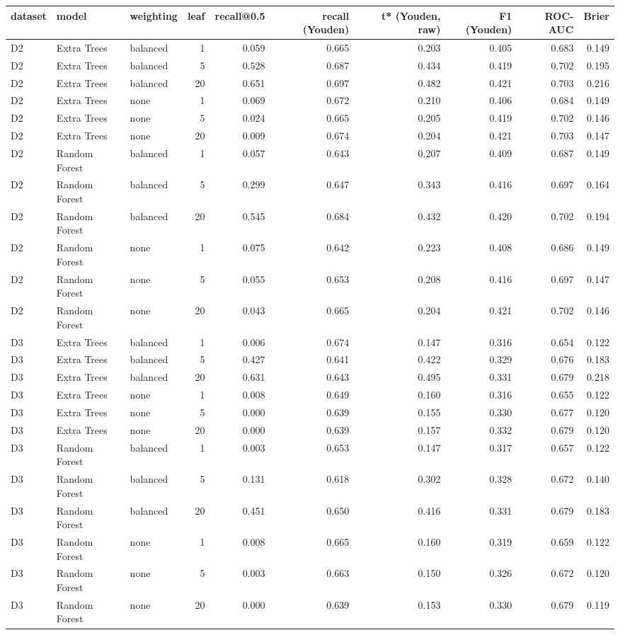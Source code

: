 \begin{tabular}{lllrrrrrrr}
\toprule
dataset & model & weighting & leaf & recall@0.5 & recall (Youden) & t* (Youden, raw) & F1 (Youden) & ROC-AUC & Brier \\
\midrule
D2 & Extra Trees & balanced & 1 & 0.059 & 0.665 & 0.203 & 0.405 & 0.683 & 0.149 \\
D2 & Extra Trees & balanced & 5 & 0.528 & 0.687 & 0.434 & 0.419 & 0.702 & 0.195 \\
D2 & Extra Trees & balanced & 20 & 0.651 & 0.697 & 0.482 & 0.421 & 0.703 & 0.216 \\
D2 & Extra Trees & none & 1 & 0.069 & 0.672 & 0.210 & 0.406 & 0.684 & 0.149 \\
D2 & Extra Trees & none & 5 & 0.024 & 0.665 & 0.205 & 0.419 & 0.702 & 0.146 \\
D2 & Extra Trees & none & 20 & 0.009 & 0.674 & 0.204 & 0.421 & 0.703 & 0.147 \\
D2 & Random Forest & balanced & 1 & 0.057 & 0.643 & 0.207 & 0.409 & 0.687 & 0.149 \\
D2 & Random Forest & balanced & 5 & 0.299 & 0.647 & 0.343 & 0.416 & 0.697 & 0.164 \\
D2 & Random Forest & balanced & 20 & 0.545 & 0.684 & 0.432 & 0.420 & 0.702 & 0.194 \\
D2 & Random Forest & none & 1 & 0.075 & 0.642 & 0.223 & 0.408 & 0.686 & 0.149 \\
D2 & Random Forest & none & 5 & 0.055 & 0.653 & 0.208 & 0.416 & 0.697 & 0.147 \\
D2 & Random Forest & none & 20 & 0.043 & 0.665 & 0.204 & 0.421 & 0.702 & 0.146 \\
D3 & Extra Trees & balanced & 1 & 0.006 & 0.674 & 0.147 & 0.316 & 0.654 & 0.122 \\
D3 & Extra Trees & balanced & 5 & 0.427 & 0.641 & 0.422 & 0.329 & 0.676 & 0.183 \\
D3 & Extra Trees & balanced & 20 & 0.631 & 0.643 & 0.495 & 0.331 & 0.679 & 0.218 \\
D3 & Extra Trees & none & 1 & 0.008 & 0.649 & 0.160 & 0.316 & 0.655 & 0.122 \\
D3 & Extra Trees & none & 5 & 0.000 & 0.639 & 0.155 & 0.330 & 0.677 & 0.120 \\
D3 & Extra Trees & none & 20 & 0.000 & 0.639 & 0.157 & 0.332 & 0.679 & 0.120 \\
D3 & Random Forest & balanced & 1 & 0.003 & 0.653 & 0.147 & 0.317 & 0.657 & 0.122 \\
D3 & Random Forest & balanced & 5 & 0.131 & 0.618 & 0.302 & 0.328 & 0.672 & 0.140 \\
D3 & Random Forest & balanced & 20 & 0.451 & 0.650 & 0.416 & 0.331 & 0.679 & 0.183 \\
D3 & Random Forest & none & 1 & 0.008 & 0.665 & 0.160 & 0.319 & 0.659 & 0.122 \\
D3 & Random Forest & none & 5 & 0.003 & 0.663 & 0.150 & 0.326 & 0.672 & 0.120 \\
D3 & Random Forest & none & 20 & 0.000 & 0.639 & 0.153 & 0.330 & 0.679 & 0.119 \\
\bottomrule
\end{tabular}
